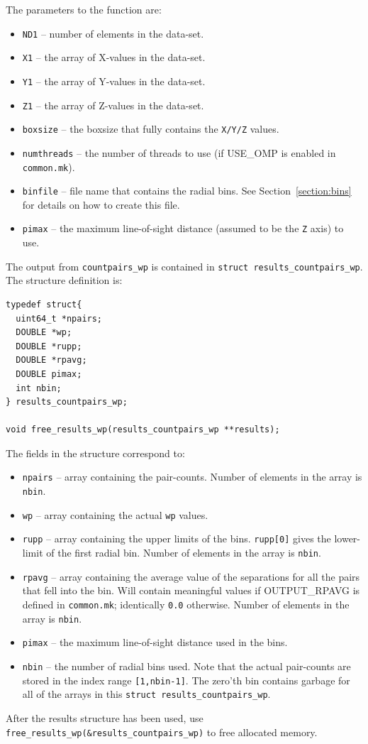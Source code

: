 \documentclass[12pt,titlepage]{article}
\newcommand{\wprp}{\ensuremath{{w_p(r_p)}}\xspace}
\begin{document}
The parameters to the function are:
\begin{itemize}
\item \texttt{ND1} -- number of elements in the data-set.
\item \texttt{X1}  -- the array of X-values in the data-set.
\item \texttt{Y1}  -- the array of Y-values in the data-set.
\item \texttt{Z1}  -- the array of Z-values in the data-set.
\item \texttt{boxsize}  -- the boxsize that fully contains the \texttt{X/Y/Z} values. 
\item \texttt{numthreads} -- the number of threads to use (if USE\_OMP is enabled in \texttt{common.mk}).
\item \texttt{binfile} -- file name that contains the radial bins. See Section~\ref{section:bins} for details on how to create this file.
\item \texttt{pimax} -- the maximum line-of-sight distance (assumed to be the \texttt{Z} axis) to use. 
\end{itemize}

The output from \texttt{countpairs\_wp} is contained in \texttt{struct results\_countpairs\_wp}. The structure definition is:
\begin{lstlisting}[label={code:API_wp_struct},caption={Structure definition for the output of \wprp}]
typedef struct{
  uint64_t *npairs;
  DOUBLE *wp;
  DOUBLE *rupp;
  DOUBLE *rpavg;
  DOUBLE pimax;
  int nbin;
} results_countpairs_wp;

void free_results_wp(results_countpairs_wp **results);
\end{lstlisting}

The fields in the structure correspond to:
\begin{itemize}
\item \texttt{npairs} -- array containing the pair-counts.  Number of elements in the array is \texttt{nbin}.
\item \texttt{wp}     -- array containing the actual \texttt{wp} values. 
\item \texttt{rupp}   -- array containing the upper limits of the bins. \texttt{rupp[0]} gives the lower-limit of the first radial bin. Number of elements 
in the array is \texttt{nbin}. 
\item \texttt{rpavg}  -- array containing the average value of the separations for all the pairs that fell into the bin. Will contain 
meaningful values if OUTPUT\_RPAVG is defined in \texttt{common.mk}; identically \texttt{0.0} otherwise. Number of elements in the array is \texttt{nbin}.
\item \texttt{pimax}  -- the maximum line-of-sight distance used in the bins. 
\item \texttt{nbin}   -- the number of radial bins used. Note that the actual pair-counts are stored in the index range \texttt{[1,nbin-1]}. The
zero'th bin contains garbage for all of the arrays in this \texttt{struct results\_countpairs\_wp}.
\end{itemize}
After the results structure has been used, use \texttt{free\_results\_wp(\&results\_countpairs\_wp)} to free allocated memory. 
\end{document}
